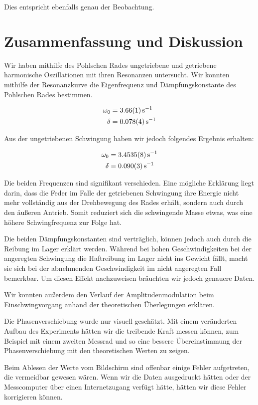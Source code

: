 \documentclass[a4paper,german,12pt,smallheadings]{scrartcl}
\begin{document}
Dies entspricht ebenfalls genau der Beobachtung.

\section{Zusammenfassung und Diskussion}
Wir haben mithilfe des Pohlschen Rades ungetriebene und getriebene harmonische
Oszillationen mit ihren Resonanzen untersucht. Wir konnten mithilfe der
Resonanzkurve die Eigenfrequenz und Dämpfungskonstante des Pohlschen Rades
bestimmen.

\begin{align}
  \omega_0 &= \SI{3.66+-0.01}{s^{-1}} \\
  \delta &= \SI{0.078+-0.004}{s^{-1}}
\end{align}

Aus der ungetriebenen Schwingung haben wir jedoch folgendes Ergebnis erhalten:

\begin{align}
  \omega_0 &= \SI{3.4535+-0.0008}{s^{-1}} \\
  \delta &= \SI{0.090+-0.003}{s^{-1}}
\end{align}

Die beiden Frequenzen sind signifikant verschieden. Eine mögliche Erklärung
liegt darin, dass die Feder im Falle der getriebenen Schwingung ihre Energie
nicht mehr vollständig aus der Drehbewegung des Rades erhält, sondern auch
durch den äußeren Antrieb. Somit reduziert sich die schwingende Masse etwas,
was eine höhere Schwingfrequenz zur Folge hat.

Die beiden Dämpfungskonstanten sind verträglich, können jedoch auch durch die
Reibung im Lager erklärt werden. Während bei hohen Geschwindigkeiten bei der
angeregten Schwingung die Haftreibung im Lager nicht ins Gewicht fällt, macht
sie sich bei der abnehmenden Geschwindigkeit im nicht angeregten Fall
bemerkbar. Um diesen Effekt nachzuweisen bräuchten wir jedoch genauere Daten.

Wir konnten außerdem den Verlauf der Amplitudenmodulation beim
Einschwingvorgang anhand der theoretischen Überlegungen erklären.

Die Phasenverschiebung wurde nur visuell geschätzt. Mit einem veränderten
Aufbau des Experiments hätten wir die treibende Kraft messen können, zum
Beispiel mit einem zweiten Messrad und so eine bessere Übereinstimmung der
Phasenverschiebung mit den theoretischen Werten zu zeigen.

Beim Ablesen der Werte vom Bildschirm sind offenbar einige Fehler aufgetreten,
die vermeidbar gewesen wären.  Wenn wir die Daten ausgedruckt hätten oder der
Messcomputer über einen Internetzugang verfügt hätte, hätten wir diese Fehler
korrigieren können.
\end{document}
